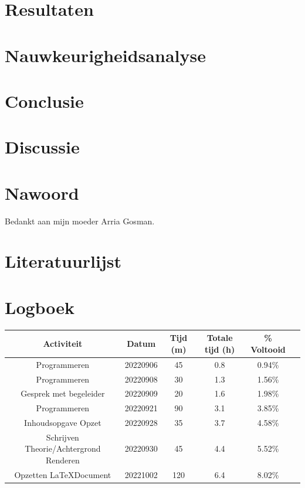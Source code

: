 \documentclass[12pt, a4paper]{article}
\begin{document}
\section{Resultaten}
\clearpage
\section{Nauwkeurigheidsanalyse}
\clearpage
\section{Conclusie}
\clearpage
\section{Discussie}
\clearpage
\section{Nawoord}
Bedankt aan mijn moeder Arria Gosman.
\clearpage
\section{Literatuurlijst}


\clearpage
\section{Logboek}
\begin{adjustbox}{angle=270}
\begin{tabular}{ | c | c c c c c | }
\hline
Activiteit & Datum & Tijd (m) & Totale tijd (h) &       \% Voltooid \\
\hline
Programmeren & 20220906 & 45 & 0.8 & 0.94\% \\
Programmeren & 20220908 & 30 & 1.3 & 1.56\% \\
Gesprek met begeleider & 20220909 & 20 & 1.6 & 1.98\% \\
Programmeren & 20220921 & 90 & 3.1 & 3.85\% \\
Inhoudsopgave Opzet & 20220928 & 35 & 3.7 & 4.58\% \\
Schrijven Theorie/Achtergrond Renderen & 20220930 & 45 & 4.4 & 5.52\% \\
Opzetten \LaTeX \space Document & 20221002 & 120 & 6.4 & 8.02\% \\
\hline
\end{tabular}
\end{adjustbox}
\end{document}
